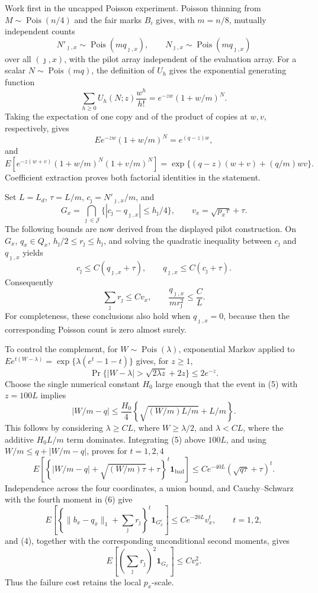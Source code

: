 Work first in the uncapped Poisson experiment.  Poisson thinning from \(M\sim\operatorname{Pois}(n/4)\) and the fair marks \(B_i\) gives, with \(m=n/8\), mutually independent counts
\[
 N'_{\jmath,x}\sim\operatorname{Pois}(mq_{\jmath,x}),\qquad
 N_{\jmath,x}\sim\operatorname{Pois}(mq_{\jmath,x})
\]
over all \((\jmath,x)\), with the pilot array independent of the evaluation array.  For a scalar \(N\sim\operatorname{Pois}(mq)\), the definition of \(U_h\) gives the exponential generating function
\[
 \sum_{h\geq0}U_h(N;z)\frac{w^h}{h!}=e^{-zw}(1+w/m)^N.
\]
Taking the expectation of one copy and of the product of copies at \(w,v\), respectively, gives
\[
 E e^{-zw}(1+w/m)^N=e^{(q-z)w},
\]
and
\[
 E\!\left[e^{-z(w+v)}(1+w/m)^N(1+v/m)^N\right]
 =\exp\{(q-z)(w+v)+(q/m)wv\}.
\]
Coefficient extraction proves both factorial identities in the statement.

Set \(L=L_d\), \(\tau=L/m\), \(c_\jmath=N'_{\jmath,x}/m\), and
\[
 G_x=\bigcap_{\jmath\in\mathcal J}\bigl\{|c_\jmath-q_{\jmath,x}|\leq h_\jmath/4\bigr\},
 \qquad v_x=\sqrt{p_x\tau}+\tau.
\]
The following bounds are now derived from the displayed pilot construction.  On \(G_x\), \(q_x\in Q_x\), \(h_\jmath/2\leq r_\jmath\leq h_\jmath\), and solving the quadratic inequality between \(c_\jmath\) and \(q_{\jmath,x}\) yields
\[
 c_\jmath\leq C(q_{\jmath,x}+\tau),\qquad
 q_{\jmath,x}\leq C(c_\jmath+\tau).
\]
Consequently
\[
 \sum_\jmath r_\jmath\leq Cv_x,\qquad
 \frac{q_{\jmath,x}}{mr_\jmath^2}\leq\frac C L.                     \tag{4}
\]
For completeness, these conclusions also hold when \(q_{\jmath,x}=0\), because then the corresponding Poisson count is zero almost surely.

To control the complement, for \(W\sim\operatorname{Pois}(\lambda)\), exponential Markov applied to
\(E e^{t(W-\lambda)}=\exp\{\lambda(e^t-1-t)\}\) gives, for \(z\geq1\),
\[
 \Pr\{|W-\lambda|>\sqrt{2\lambda z}+2z\}\leq2e^{-z}.                \tag{5}
\]
Choose the single numerical constant \(H_0\) large enough that the event in (5) with \(z=100L\) implies
\[
 |W/m-q|\leq\frac{H_0}{4}\left\{\sqrt{(W/m)L/m}+L/m\right\}.
\]
This follows by considering \(\lambda\geq C L\), where \(W\geq\lambda/2\), and \(\lambda<CL\), where the additive \(H_0L/m\) term dominates.  Integrating (5) above \(100L\), and using \(W/m\leq q+|W/m-q|\), proves for \(t=1,2,4\)
\[
 E\left[\left\{|W/m-q|+\sqrt{(W/m)\tau}+\tau\right\}^t
       \mathbf1_{\mathrm{bad}}\right]
 \leq C e^{-40L}(\sqrt{q\tau}+\tau)^t.                              \tag{6}
\]
Independence across the four coordinates, a union bound, and Cauchy--Schwarz with the fourth moment in (6) give
\[
 E\left[\left\{\|b_x-q_x\|_1+\sum_\jmath r_\jmath\right\}^t
       \mathbf1_{G_x^c}\right]
 \leq C e^{-20L}v_x^t,\qquad t=1,2,                                  \tag{7}
\]
and (4), together with the corresponding unconditional second moments, gives
\[
 E\left[\left(\sum_\jmath r_\jmath\right)^2\mathbf1_{G_x}\right]
 \leq Cv_x^2.                                                         \tag{8}
\]
Thus the failure cost retains the local \(p_x\)-scale.

